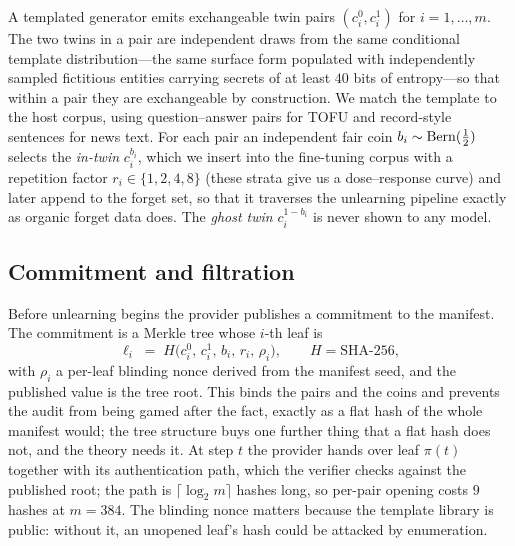 A templated generator emits exchangeable twin pairs
$(c_i^0, c_i^1)$ for $i = 1,\dots,m$. The two twins in a pair are independent draws from
the same conditional template distribution---the same surface form populated with
independently sampled fictitious entities carrying secrets of at least $40$ bits of
entropy---so that within a pair they are exchangeable by construction. We match the
template to the host corpus, using question--answer pairs for TOFU and record-style
sentences for news text. For each pair an
independent fair coin $b_i \sim \mathrm{Bern}(\tfrac12)$ selects the \emph{in-twin}
$c_i^{b_i}$, which we insert into
the fine-tuning corpus with a repetition factor $r_i \in \{1,2,4,8\}$ (these strata give
us a dose--response curve) and later append to the forget set, so that it traverses the
unlearning pipeline exactly as organic forget data does. The \emph{ghost twin}
$c_i^{1-b_i}$ is never shown to any model.

\subsection{Commitment and filtration}\label{sec:filtration}

Before unlearning begins the provider publishes a commitment to the manifest. The
commitment is a Merkle tree whose $i$-th leaf is
\begin{equation}\label{eq:commit}
\ell_i \;=\; H\bigl(c_i^0,\, c_i^1,\, b_i,\, r_i,\, \rho_i\bigr),
\qquad H = \text{SHA-256},
\end{equation}
with $\rho_i$ a per-leaf blinding nonce derived from the manifest seed, and the
published value is the tree root. This binds the pairs and the coins and prevents the
audit from being gamed after the fact, exactly as a flat hash of the whole manifest
would; the tree structure buys one further thing that a flat hash does not, and the
theory needs it. At step $t$ the provider hands over leaf $\pi(t)$ together with its
authentication path, which the verifier checks against the published root; the path is
$\lceil\log_2 m\rceil$ hashes long, so per-pair opening costs $9$ hashes at
$m = 384$. The blinding nonce matters because the template library is public: without
it, an unopened leaf's hash could be attacked by enumeration.

